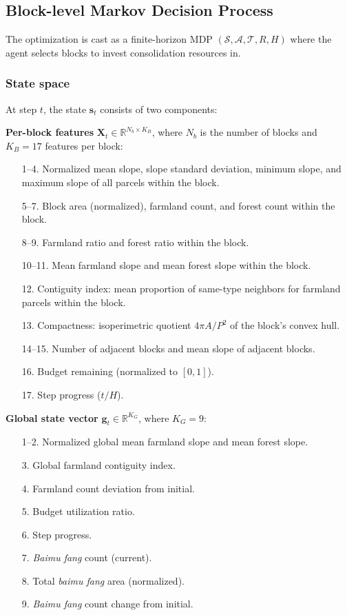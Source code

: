 \documentclass[preprint,12pt]{elsarticle}
\begin{document}
\subsection{Block-level Markov Decision Process}
\label{sec:mdp}

The optimization is cast as a finite-horizon MDP $(\mathcal{S}, \mathcal{A}, \mathcal{T}, R, H)$ where the agent selects blocks to invest consolidation resources in.

\subsubsection{State space}

At step $t$, the state $\mathbf{s}_t$ consists of two components:

\textbf{Per-block features} $\mathbf{X}_t \in \mathbb{R}^{N_b \times K_B}$, where $N_b$ is the number of blocks and $K_B = 17$ features per block:
\begin{enumerate}
\item[1--4.] Normalized mean slope, slope standard deviation, minimum slope, and maximum slope of all parcels within the block.
\item[5--7.] Block area (normalized), farmland count, and forest count within the block.
\item[8--9.] Farmland ratio and forest ratio within the block.
\item[10--11.] Mean farmland slope and mean forest slope within the block.
\item[12.] Contiguity index: mean proportion of same-type neighbors for farmland parcels within the block.
\item[13.] Compactness: isoperimetric quotient $4\pi A / P^2$ of the block's convex hull.
\item[14--15.] Number of adjacent blocks and mean slope of adjacent blocks.
\item[16.] Budget remaining (normalized to $[0, 1]$).
\item[17.] Step progress ($t / H$).
\end{enumerate}

\textbf{Global state vector} $\mathbf{g}_t \in \mathbb{R}^{K_G}$, where $K_G = 9$:
\begin{enumerate}
\item[1--2.] Normalized global mean farmland slope and mean forest slope.
\item[3.] Global farmland contiguity index.
\item[4.] Farmland count deviation from initial.
\item[5.] Budget utilization ratio.
\item[6.] Step progress.
\item[7.] \textit{Baimu fang} count (current).
\item[8.] Total \textit{baimu fang} area (normalized).
\item[9.] \textit{Baimu fang} count change from initial.
\end{enumerate}
\end{document}
